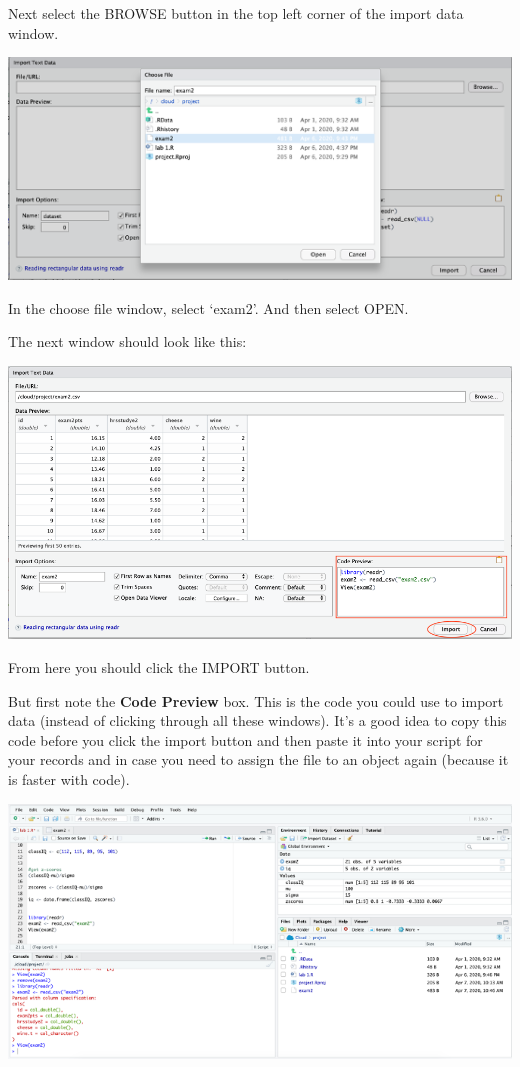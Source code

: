 \documentclass[
]{book}
\begin{document}
Next select the BROWSE button in the top left corner of the import data window.

\includegraphics{img/importbrowse.png}

In the choose file window, select `exam2'. And then select OPEN.

The next window should look like this:

\includegraphics{img/importwindow2.png}

From here you should click the IMPORT button.

But first note the \textbf{Code Preview} box. This is the code you could use to import data (instead of clicking through all these windows). It's a good idea to copy this code before you click the import button and then paste it into your script for your records and in case you need to assign the file to an object again (because it is faster with code).

\includegraphics{img/importcomplete.png}
\end{document}
